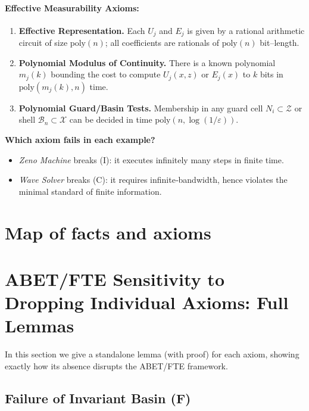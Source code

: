 \documentclass[12pt]{article}
\theoremstyle{definition}
\theoremstyle{plain}
\begin{document}
\paragraph{Effective Measurability Axioms:}
\begin{enumerate}[label=(EM\arabic*), leftmargin=2em]
  \item \textbf{Effective Representation.} Each $U_j$ and $E_j$ is given by a rational arithmetic circuit of size $\mathrm{poly}(n)$; all coefficients are rationals of $\mathrm{poly}(n)$ bit–length.
  \item \textbf{Polynomial Modulus of Continuity.} There is a known polynomial $m_j(k)$ bounding the cost to compute $U_j(x,z)$ or $E_j(x)$ to $k$ bits in $\mathrm{poly}(m_j(k),n)$ time.
  \item \textbf{Polynomial Guard/Basin Tests.} Membership in any guard cell $N_i\subset\mathcal Z$ or shell $\mathcal B_n\subset\mathcal X$ can be decided in time $\mathrm{poly}(n,\log(1/\varepsilon))$.
\end{enumerate}

\medskip
\noindent
\textbf{Which axiom fails in each example?}
\begin{itemize}
  \item \emph{Zeno Machine} breaks (I): it executes infinitely many steps in finite time.
  \item \emph{Wave Solver} breaks (C): it requires infinite‑bandwidth, hence violates the minimal standard of finite information.
\end{itemize}

\section{Map of facts and axioms}
%

\section{ABET/FTE Sensitivity to Dropping Individual Axioms: Full Lemmas}

In this section we give a standalone lemma (with proof) for each axiom, showing exactly how its absence disrupts the ABET/FTE framework.

\subsection{Failure of Invariant Basin (F)}
\end{document}
